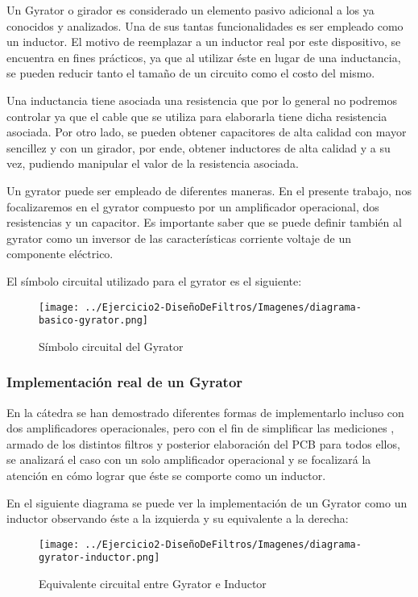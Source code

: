 Un Gyrator o girador es considerado un elemento pasivo adicional a los ya conocidos y analizados. Una de sus tantas funcionalidades es ser empleado como un inductor. 
El motivo de reemplazar a un inductor real por este dispositivo, se encuentra en fines prácticos, ya que al utilizar éste en lugar de una inductancia, se pueden reducir 
tanto el tamaño de un circuito como el costo del mismo. 

Una inductancia tiene asociada una resistencia que por lo general no podremos controlar ya que el cable que se utiliza para elaborarla tiene dicha resistencia asociada. 
Por otro lado, se pueden obtener capacitores de alta calidad con mayor sencillez y con un girador, por ende, obtener inductores de alta calidad y a su vez, pudiendo manipular el valor de la resistencia asociada.

Un gyrator puede ser empleado de diferentes maneras. En el presente trabajo, nos focalizaremos en el gyrator compuesto por un amplificador operacional, dos resistencias y un capacitor.
Es importante saber que se puede definir también al gyrator como un inversor de las características corriente voltaje de un componente eléctrico.

El símbolo circuital utilizado para el gyrator es el siguiente:

\begin{figure}[H]
    \centering
    \texttt{[image: ../Ejercicio2-DiseñoDeFiltros/Imagenes/diagrama-basico-gyrator.png]}
    \caption{Símbolo circuital del Gyrator}
\end{figure}

\subsubsection{Implementación real de un Gyrator}

En la cátedra se han demostrado diferentes formas de implementarlo incluso con dos amplificadores operacionales, pero con el fin de simplificar las mediciones
, armado de los distintos filtros y posterior elaboración del PCB para todos ellos, se analizará el caso con un solo amplificador operacional y se focalizará la atención en cómo lograr que éste se comporte como un 
inductor.

En el siguiente diagrama se puede ver la implementación de un Gyrator como un inductor observando éste a la izquierda y su equivalente a la derecha:

\begin{figure}[H]
    \centering
    \texttt{[image: ../Ejercicio2-DiseñoDeFiltros/Imagenes/diagrama-gyrator-inductor.png]}
    \caption{Equivalente circuital entre Gyrator e Inductor}
\end{figure}

